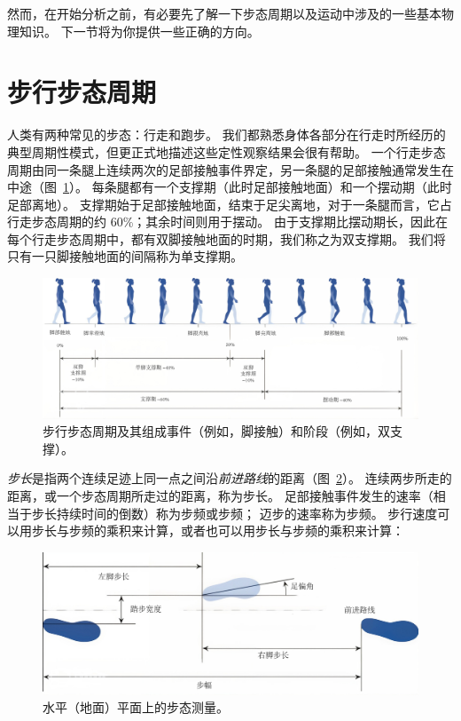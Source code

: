 然而，在开始分析之前，有必要先了解一下步态周期以及运动中涉及的一些基本物理知识。
下一节将为你提供一些正确的方向。


\section{步行步态周期}

人类有两种常见的步态：行走和跑步。
我们都熟悉身体各部分在行走时所经历的典型周期性模式，但更正式地描述这些定性观察结果会很有帮助。
一个行走步态周期由同一条腿上连续两次的足部接触事件界定，另一条腿的足部接触通常发生在中途（图~\ref{fig:2_2}）。
每条腿都有一个支撑期（此时足部接触地面）和一个摆动期（此时足部离地）。
支撑期始于足部接触地面，结束于足尖离地，对于一条腿而言，它占行走步态周期的约 60\%；其余时间则用于摆动。
由于支撑期比摆动期长，因此在每个行走步态周期中，都有双脚接触地面的时期，我们称之为双支撑期。
我们将只有一只脚接触地面的间隔称为单支撑期。


\begin{figure}[!htb]
	\centering
	\includegraphics[width=1.0\linewidth]{chap2/2_2}
	\caption{步行步态周期及其组成事件（例如，脚接触）和阶段（例如，双支撑）。 \label{fig:2_2}}
\end{figure}


\textit{步长}是指两个连续足迹上同一点之间沿\textit{前进路线}的距离（图~\ref{fig:2_3}）。
连续两步所走的距离，或一个步态周期所走过的距离，称为步长。
足部接触事件发生的速率（相当于步长持续时间的倒数）称为步频或步频；
迈步的速率称为步频。
步行速度可以用步长与步频的乘积来计算，或者也可以用步长与步频的乘积来计算：


\begin{figure}[!htb]
	\centering
	\includegraphics[width=0.8\linewidth]{chap2/2_3}
	\caption{水平（地面）平面上的步态测量。 \label{fig:2_3}}
\end{figure}

